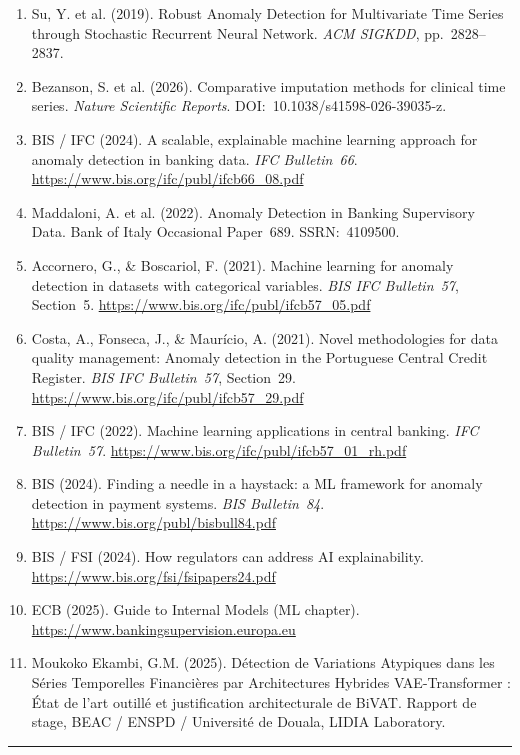\documentclass[12pt,a4paper]{article}
\begin{document}
\begin{enumerate}
\item Su, Y. et al. (2019). Robust Anomaly Detection for Multivariate Time
Series through Stochastic Recurrent Neural Network. \textit{ACM SIGKDD},
pp.~2828--2837.

\item Bezanson, S. et al. (2026). Comparative imputation methods for
clinical time series. \textit{Nature Scientific Reports}.
DOI:~10.1038/s41598-026-39035-z.

\item BIS / IFC (2024). A scalable, explainable machine learning approach
for anomaly detection in banking data. \textit{IFC Bulletin~66}.
\url{https://www.bis.org/ifc/publ/ifcb66\_08.pdf}

\item Maddaloni, A. et al. (2022). Anomaly Detection in Banking Supervisory
Data. Bank of Italy Occasional Paper~689. SSRN:~4109500.

\item Accornero, G., \& Boscariol, F. (2021). Machine learning for anomaly
detection in datasets with categorical variables. \textit{BIS IFC Bulletin~57},
Section~5.
\url{https://www.bis.org/ifc/publ/ifcb57\_05.pdf}

\item Costa, A., Fonseca, J., \& Maurício, A. (2021). Novel methodologies for
data quality management: Anomaly detection in the Portuguese Central Credit
Register. \textit{BIS IFC Bulletin~57}, Section~29.
\url{https://www.bis.org/ifc/publ/ifcb57\_29.pdf}

\item BIS / IFC (2022). Machine learning applications in central banking.
\textit{IFC Bulletin~57}.
\url{https://www.bis.org/ifc/publ/ifcb57\_01\_rh.pdf}

\item BIS (2024). Finding a needle in a haystack: a ML framework for anomaly
detection in payment systems. \textit{BIS Bulletin~84}.
\url{https://www.bis.org/publ/bisbull84.pdf}

\item BIS / FSI (2024). How regulators can address AI explainability.
\url{https://www.bis.org/fsi/fsipapers24.pdf}

\item ECB (2025). Guide to Internal Models (ML chapter).
\url{https://www.bankingsupervision.europa.eu}

\item Moukoko Ekambi, G.M. (2025). Détection de Variations Atypiques dans
les Séries Temporelles Financières par Architectures Hybrides VAE-Transformer :
État de l'art outillé et justification architecturale de BiVAT. Rapport de
stage, BEAC / ENSPD / Université de Douala, LIDIA Laboratory.

\end{enumerate}

\vspace{2cm}
\hrule
\vspace{0.5cm}
\end{document}
